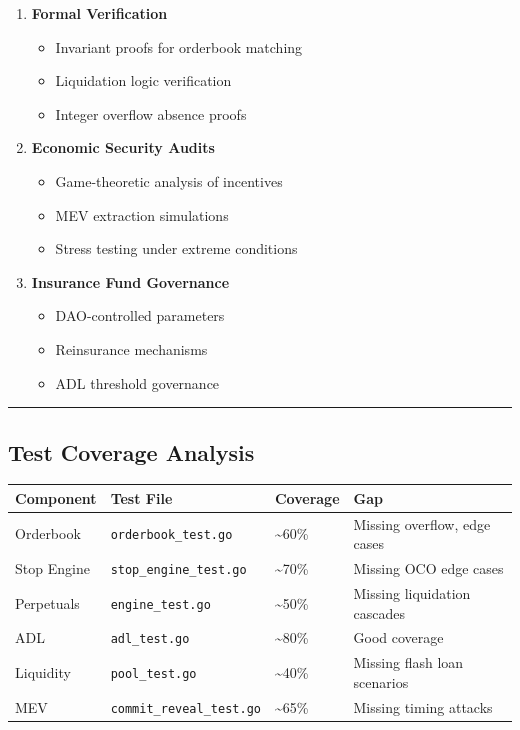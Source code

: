 \documentclass[
]{article}
\newcounter{none} %
\providecommand{\tightlist}{%
  \setlength{\itemsep}{0pt}\setlength{\parskip}{0pt}}
\begin{document}
\begin{enumerate}
\def\labelenumi{\arabic{enumi}.}
\setcounter{enumi}{7}
\item
  \textbf{Formal Verification}

  \begin{itemize}
  \tightlist
  \item
    Invariant proofs for orderbook matching
  \item
    Liquidation logic verification
  \item
    Integer overflow absence proofs
  \end{itemize}
\item
  \textbf{Economic Security Audits}

  \begin{itemize}
  \tightlist
  \item
    Game-theoretic analysis of incentives
  \item
    MEV extraction simulations
  \item
    Stress testing under extreme conditions
  \end{itemize}
\item
  \textbf{Insurance Fund Governance}

  \begin{itemize}
  \tightlist
  \item
    DAO-controlled parameters
  \item
    Reinsurance mechanisms
  \item
    ADL threshold governance
  \end{itemize}
\end{enumerate}

\begin{center}\rule{0.5\linewidth}{0.5pt}\end{center}

\subsection{Test Coverage Analysis}\label{test-coverage-analysis}

{\def\LTcaptype{none} %
\begin{longtable}[]{@{}llll@{}}
\toprule\noalign{}
Component & Test File & Coverage & Gap \\
\midrule\noalign{}
\endhead
\bottomrule\noalign{}
\endlastfoot
Orderbook & \texttt{orderbook\_test.go} & \textasciitilde60\% & Missing
overflow, edge cases \\
Stop Engine & \texttt{stop\_engine\_test.go} & \textasciitilde70\% &
Missing OCO edge cases \\
Perpetuals & \texttt{engine\_test.go} & \textasciitilde50\% & Missing
liquidation cascades \\
ADL & \texttt{adl\_test.go} & \textasciitilde80\% & Good coverage \\
Liquidity & \texttt{pool\_test.go} & \textasciitilde40\% & Missing flash
loan scenarios \\
MEV & \texttt{commit\_reveal\_test.go} & \textasciitilde65\% & Missing
timing attacks \\
\end{longtable}
}
\end{document}
